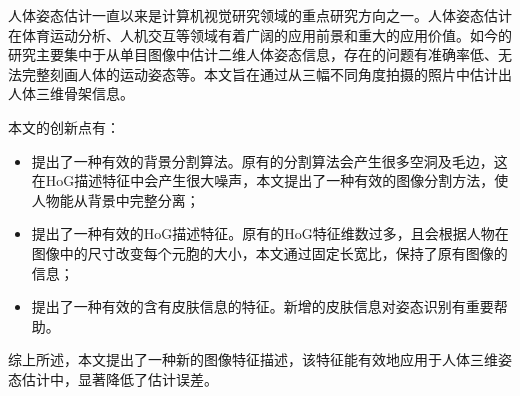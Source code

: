 
 

\makeatletter
\ifthu@bachelor\relax\else
  \ifthu@doctor
  \else
    \ifthu@master
    \fi
  \fi
\fi
\makeatother





\begin{cabstract}

人体姿态估计一直以来是计算机视觉研究领域的重点研究方向之一。人体姿态估计在体育运动分析、人机交互等领域有着广阔的应用前景和重大的应用价值。如今的研究主要集中于从单目图像中估计二维人体姿态信息，存在的问题有准确率低、无法完整刻画人体的运动姿态等。本文旨在通过从三幅不同角度拍摄的照片中估计出人体三维骨架信息。

本文的创新点有：
  \begin{itemize}
    \item 提出了一种有效的背景分割算法。原有的分割算法会产生很多空洞及毛边，这在HoG描述特征中会产生很大噪声，本文提出了一种有效的图像分割方法，使人物能从背景中完整分离；
    \item 提出了一种有效的HoG描述特征。原有的HoG特征维数过多，且会根据人物在图像中的尺寸改变每个元胞的大小，本文通过固定长宽比，保持了原有图像的信息；
    \item 提出了一种有效的含有皮肤信息的特征。新增的皮肤信息对姿态识别有重要帮助。
  \end{itemize}

综上所述，本文提出了一种新的图像特征描述，该特征能有效地应用于人体三维姿态估计中，显著降低了估计误差。

\end{cabstract}


\begin{eabstract}
   
\end{eabstract}

